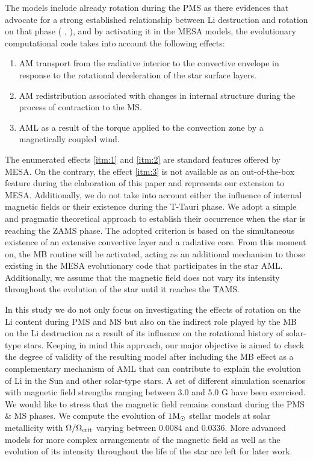 \documentclass[fleqn,usenatbib]{mnras}
\begin{document}
The models include already rotation during the PMS as there evidences that advocate for a strong established relationship between Li destruction and rotation on that phase (\citeauthor{Bouvier2016} \citeyear{Bouvier2016}, \citeyear{Bouvier2018}), and by activating it in the MESA models, the evolutionary computational code takes into account the following effects: 

\begin{enumerate}
    \item AM transport from the radiative interior to the convective envelope in response to the rotational deceleration of the star surface layers\label{itm:1}.
    \item AM redistribution associated with changes in internal structure during the process of contraction to the MS\label{itm:2}.
    \item AML as a result of the torque applied to the convection zone by a magnetically coupled wind\label{itm:3}.
\end{enumerate}

The enumerated effects \ref{itm:1} and \ref{itm:2} are standard features offered by MESA. On the contrary, the effect \ref{itm:3} is not available as an out-of-the-box feature during the elaboration of this paper and represents our extension to MESA. Additionally, we do not take into account either the influence of internal magnetic fields or their existence during the T-Tauri phase. We adopt a simple and pragmatic theoretical approach to establish their occurrence when the star is reaching the ZAMS phase. The adopted criterion is based on the simultaneous existence of an extensive convective layer and a radiative core. From this moment on, the MB routine will be activated, acting as an additional mechanism to those existing in the MESA evolutionary code that participates in the star AML. Additionally, we assume that the magnetic field does not vary its intensity throughout the evolution of the star until it reaches the TAMS.\par

In this study we do not only focus on investigating the effects of rotation on the Li content during PMS and MS but also on the indirect role played by the MB on the Li destruction as a result of its influence on the rotational history of solar-type stars. Keeping in mind this approach, our major objective is aimed to check the degree of validity of the resulting model after including the MB effect as a complementary mechanism of AML that can contribute to explain the evolution of Li in the Sun and other solar-type stars. A set of different simulation scenarios with magnetic field strengths ranging between 3.0 and 5.0 G have been exercised. We would like to stress that the magnetic field remains constant during the PMS \& MS phases. We compute the evolution of $1\mathrm{M}_\odot$ stellar models at solar metallicity with $\Omega / \Omega_{\mathrm{crit}}$ varying between $0.0084$ and $0.0336$. More advanced models for more complex arrangements of the magnetic field as well as the evolution of its intensity throughout the life of the star are left for later work.\par
\end{document}
